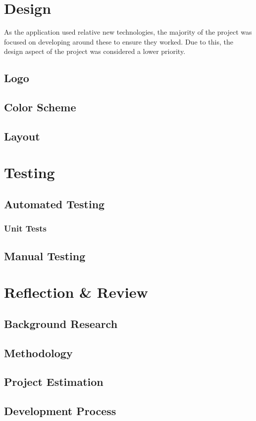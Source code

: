 \documentclass[]{report}
\begin{document}
	\chapter{Design}
		As the application used relative new technologies, the majority of the project was focused on developing around these to ensure they worked. Due to this, the design aspect of the project was considered a lower priority.
		\section{Logo}
		\section{Color Scheme}
		\section{Layout}

	\chapter{Testing}
		\section{Automated Testing}
			\subsection{Unit Tests}
		\section{Manual Testing}
	
	\chapter{Reflection \& Review}
		\section{Background Research}
		\section{Methodology}
		\section{Project Estimation}
		\section{Development Process}
\end{document}
